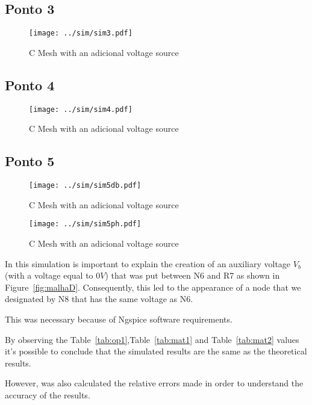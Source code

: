 \subsection{Ponto 3}

\begin{figure}[H] \centering
\texttt{[image: ../sim/sim3.pdf]}
\caption{C Mesh with an adicional voltage source} %
\label{fig:sim3}
\end{figure}

\subsection{Ponto 4}

\begin{figure}[H] \centering
\texttt{[image: ../sim/sim4.pdf]}
\caption{C Mesh with an adicional voltage source} %
\label{fig:sim4}
\end{figure}

\subsection{Ponto 5}

\begin{figure}[H] \centering
\texttt{[image: ../sim/sim5db.pdf]}
\caption{C Mesh with an adicional voltage source} %
\label{fig:sim5db}
\end{figure}

\begin{figure}[H] \centering
\texttt{[image: ../sim/sim5ph.pdf]}
\caption{C Mesh with an adicional voltage source} %
\label{fig:sim5ph}
\end{figure}

In this simulation is important to explain the creation of an auxiliary voltage $V_b$ (with a voltage equal to $0V$) that was put between N6 and R7 as shown in Figure~\ref{fig:malhaD}. Consequently, this led to the appearance of a node that we designated by N8 that has the same voltage as N6.

This was necessary because of Ngspice software requirements.

By observing the Table~\ref{tab:op1},Table~\ref{tab:mat1} and Table~\ref{tab:mat2} values it's possible to conclude that the simulated results are the same as the theoretical results.%


However, was also calculated the relative errors made in order to understand the accuracy of the results. 

